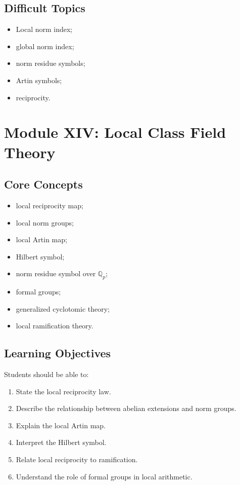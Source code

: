 \documentclass[11pt,a4paper]{article}
\newcommand{\Q}{\mathbb Q}
\begin{document}
\subsection{Difficult Topics}

\begin{itemize}
    \item Local norm index;
    \item global norm index;
    \item norm residue symbols;
    \item Artin symbols;
    \item reciprocity.
\end{itemize}

\section{Module XIV: Local Class Field Theory}

\subsection{Core Concepts}

\begin{itemize}
    \item local reciprocity map;
    \item local norm groups;
    \item local Artin map;
    \item Hilbert symbol;
    \item norm residue symbol over \(\Q_p\);
    \item formal groups;
    \item generalized cyclotomic theory;
    \item local ramification theory.
\end{itemize}

\subsection{Learning Objectives}

Students should be able to:

\begin{enumerate}
    \item State the local reciprocity law.
    \item Describe the relationship between abelian extensions
    and norm groups.
    \item Explain the local Artin map.
    \item Interpret the Hilbert symbol.
    \item Relate local reciprocity to ramification.
    \item Understand the role of formal groups in local arithmetic.
\end{enumerate}
\end{document}
